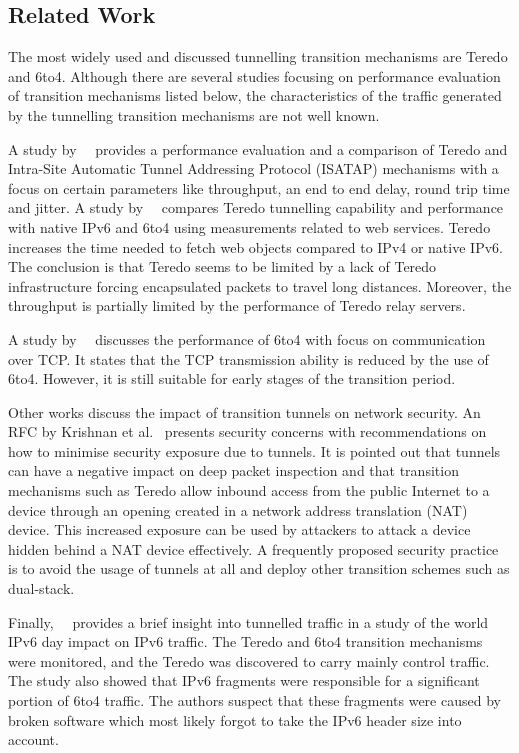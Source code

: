 \subsection{Related Work} \label{subsec:ipv6-tunnels-related-work}

The most widely used and discussed tunnelling transition mechanisms are Teredo and 6to4. Although there are several studies focusing on performance evaluation of transition mechanisms listed below, the characteristics of the traffic generated by the tunnelling transition mechanisms are not well known.

A study by~\citeauthor{Aazam-2010-Comparison}~\cite{Aazam-2010-Comparison} provides a performance evaluation and a comparison of Teredo and Intra-Site Automatic Tunnel Addressing Protocol (ISATAP) mechanisms with a focus on certain parameters like throughput, an end to end delay, round trip time and jitter. A study by~\citeauthor{Zander-2012-Investigating}~\cite{Zander-2012-Investigating} compares Teredo tunnelling capability and performance with native IPv6 and 6to4 using measurements related to web services. Teredo increases the time needed to fetch web objects compared to IPv4 or native IPv6. The conclusion is that Teredo seems to be limited by a lack of Teredo infrastructure forcing encapsulated packets to travel long distances. Moreover, the throughput is partially limited by the performance of Teredo relay servers.

A study by~\citeauthor{Bahaman-2012-Network}~\cite{Bahaman-2012-Network} discusses the performance of 6to4 with focus on communication over TCP. It states that the TCP transmission ability is reduced by the use of 6to4. However, it is still suitable for early stages of the transition period.

Other works discuss the impact of transition tunnels on network security. An RFC by Krishnan et al.~\cite{rfc6169} presents security concerns with recommendations on how to minimise security exposure due to tunnels. It is pointed out that tunnels can have a negative impact on deep packet inspection and that transition mechanisms such as Teredo allow inbound access from the public Internet to a device through an opening created in a network address translation (NAT) device. This increased exposure can be used by attackers to attack a device hidden behind a NAT device effectively. A frequently proposed security practice is to avoid the usage of tunnels at all and deploy other transition schemes such as dual-stack.

Finally,~\citeauthor{Sarrar-2012-Investigating}~\cite{Sarrar-2012-Investigating} provides a brief insight into tunnelled traffic in a study of the world IPv6 day impact on IPv6 traffic. The Teredo and 6to4 transition mechanisms were monitored, and the Teredo was discovered to carry mainly control traffic. The study also showed that IPv6 fragments were responsible for a significant portion of 6to4 traffic. The authors suspect that these fragments were caused by broken software which most likely forgot to take the IPv6 header size into account.

